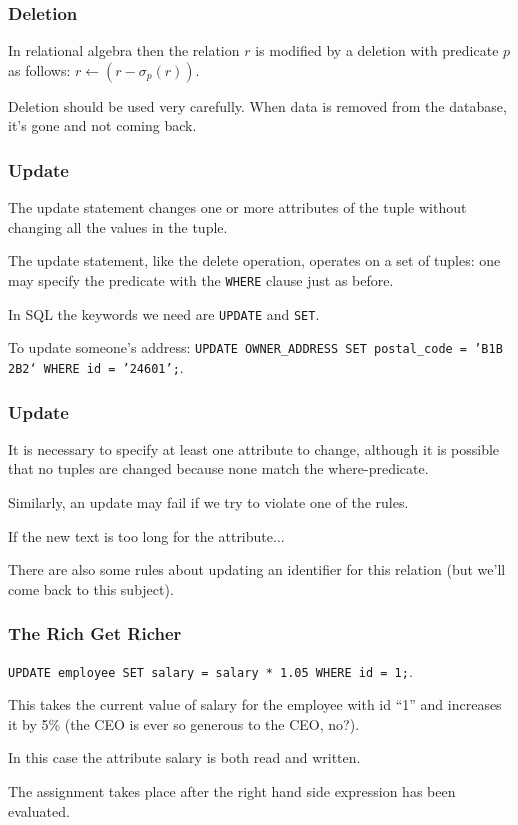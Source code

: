 \begin{frame}
\frametitle{Deletion}


In relational algebra then the relation $r$ is modified by a deletion with predicate $p$ as follows: $r \leftarrow (r - \sigma_{p}( r ) )$.

Deletion should be used very carefully. When data is removed from the database, it's gone and not coming back.


\end{frame}



\begin{frame}
\frametitle{Update}

The update statement changes one or more attributes of the tuple without changing all the values in the tuple. 

The update statement, like the delete operation, operates on a set of tuples: one may specify the predicate with the \texttt{WHERE} clause just as before. 

In SQL the keywords we need are \texttt{UPDATE} and \texttt{SET}.  

To update someone's address: \texttt{UPDATE OWNER\_ADDRESS SET postal\_code = 'B1B 2B2` WHERE id = '24601';}. 


\end{frame}



\begin{frame}
\frametitle{Update}


It is necessary to specify at least one attribute to change, although it is possible that no tuples are changed because none match the where-predicate. 

Similarly, an update may fail if we try to violate one of the rules. 

If the new text is too long for the attribute...

There are also some rules about updating an identifier for this relation (but we'll come back to this subject).

\end{frame}



\begin{frame}
\frametitle{The Rich Get Richer}

\texttt{UPDATE employee SET salary = salary * 1.05 WHERE id = 1;}. 

This takes the current value of salary for the employee with id ``1'' and increases it by 5\% (the CEO is ever so generous to the CEO, no?). 

In this case the attribute salary is both read and written. 

The assignment takes place after the right hand side expression has been evaluated.

\end{frame}



